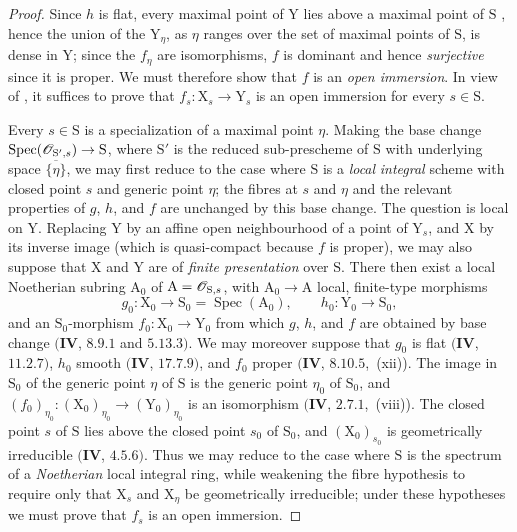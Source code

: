 \begin{proof}
Since $h$ is flat, every maximal point of $\mathrm{Y}$ lies above a maximal point of $\mathrm{S}$ , hence the union of the $\mathrm{Y}_\eta$, as $\eta$ ranges over the set of maximal points of $\mathrm{S}$, is dense in $\mathrm{Y}$; since the $f_\eta$ are isomorphisms, $f$ is dominant and hence \emph{surjective} since it is proper.
We must therefore show that $f$ is an \emph{open immersion}.
In view of , it suffices to prove that $f_s:\mathrm{X}_s\to\mathrm{Y}_s$ is an open immersion for every $s\in\mathrm{S}$.

Every $s\in\mathrm{S}$ is a specialization of a maximal point $\eta$.  Making the base change $\operatorname{Spec}(\mathscr{O}_{\mathrm{S}',s})\to\mathrm{S}$, where $\mathrm{S}'$ is the reduced sub-prescheme of $\mathrm{S}$ with underlying space $\overline{\{\eta\}}$, we may first reduce to the case where $\mathrm{S}$ is a \emph{local} \emph{integral} scheme with closed point $s$ and generic point $\eta$; the fibres at $s$ and $\eta$ and the relevant properties of $g$, $h$, and $f$ are unchanged by this base change.
The question is local on $\mathrm{Y}$.  Replacing $\mathrm{Y}$ by an affine open neighbourhood of a point of $\mathrm{Y}_s$, and $\mathrm{X}$ by its inverse image (which is quasi-compact because $f$ is proper), we may also suppose that $\mathrm{X}$ and $\mathrm{Y}$ are of \emph{finite presentation} over $\mathrm{S}$.
There then exist a local Noetherian subring $\mathrm{A}_0$ of $\mathrm{A}=\mathscr{O}_{\mathrm{S},s}$, with $\mathrm{A}_0\to\mathrm{A}$ local, finite-type morphisms
\[
  g_0:\mathrm{X}_0\to\mathrm{S}_0=\operatorname{Spec}(\mathrm{A}_0),
  \qquad h_0:\mathrm{Y}_0\to\mathrm{S}_0,
\]
and an $\mathrm{S}_0$-morphism $f_0:\mathrm{X}_0\to\mathrm{Y}_0$ from which $g$, $h$, and $f$ are obtained by base change $(\mathbf{IV}$, $8.9.1$ and $5.13.3)$.  We may moreover suppose that $g_0$ is flat $(\mathbf{IV}$, $11.2.7)$, $h_0$ smooth $(\mathbf{IV}$, $17.7.9)$, and $f_0$ proper $(\mathbf{IV}$, $8.10.5$,~(xii)).
The image in $\mathrm{S}_0$ of the generic point $\eta$ of $\mathrm{S}$ is the generic point $\eta_0$ of $\mathrm{S}_0$, and $(f_0)_{\eta_0}:(\mathrm{X}_0)_{\eta_0}\to(\mathrm{Y}_0)_{\eta_0}$ is an isomorphism $(\mathbf{IV}$, $2.7.1$,~(viii)).  The closed point $s$ of $\mathrm{S}$ lies above the closed point $s_0$ of $\mathrm{S}_0$, and $(\mathrm{X}_0)_{s_0}$ is geometrically irreducible $(\mathbf{IV}$, $4.5.6)$.
Thus we may reduce to the case where $\mathrm{S}$ is the spectrum of a \emph{Noetherian} local integral ring, while weakening the fibre hypothesis to require only that $\mathrm{X}_s$ and $\mathrm{X}_\eta$ be geometrically irreducible; under these hypotheses we must prove that $f_s$ is an open immersion.


\end{proof}
